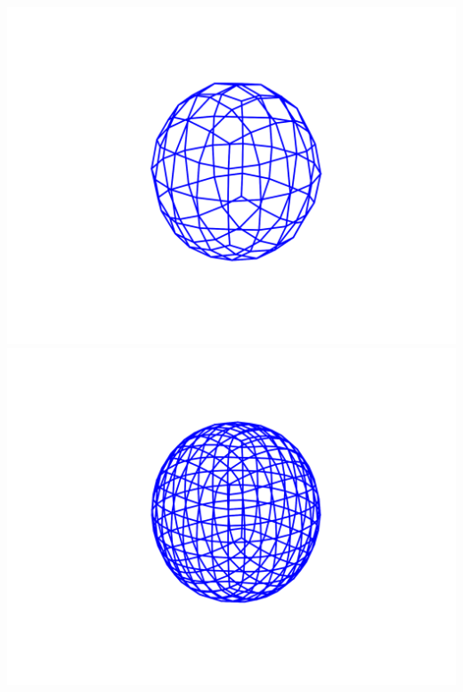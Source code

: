 \documentclass[11pt,class=report,crop=false]{standalone}
\begin{document}
\begin{center}
	\includegraphics[scale=\myscale,scale=0.5,trim={4cm 0 4cm 0},clip,]{figures/catmull-clark-cube-2}
	\includegraphics[scale=\myscale,scale=0.5,trim={4cm 0 4cm 0},clip,]{figures/catmull-clark-cube-3}  
	\hspace*{-20mm}  
\end{center}
\end{document}
